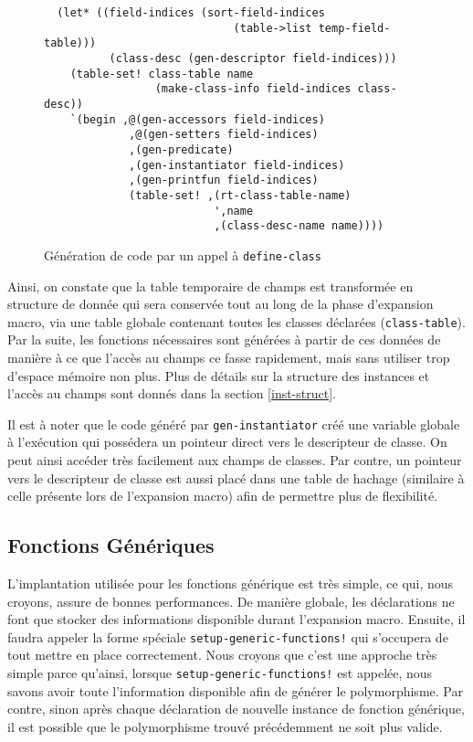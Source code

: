       \begin{figure}[h!]
        \begin{lstlisting}
  (let* ((field-indices (sort-field-indices
                             (table->list temp-field-table)))
          (class-desc (gen-descriptor field-indices)))
    (table-set! class-table name 
                 (make-class-info field-indices class-desc))
    `(begin ,@(gen-accessors field-indices)
             ,@(gen-setters field-indices)
             ,(gen-predicate)
             ,(gen-instantiator field-indices)
             ,(gen-printfun field-indices)
             (table-set! ,(rt-class-table-name)
                          ',name
                          ,(class-desc-name name))))
        \end{lstlisting}
        \caption{Génération de code par un appel à \texttt{define-class}}
        \label{class-code-gen}
      \end{figure}

      Ainsi, on constate que la table temporaire de champs est
      transformée en structure de donnée qui sera conservée tout au
      long de la phase d'expansion macro, via une table globale
      contenant toutes les classes déclarées
      (\texttt{class-table}). Par la suite, les fonctions nécessaires
      sont générées à partir de ces données de manière à ce que
      l'accès au champs ce fasse rapidement, mais sans utiliser trop
      d'espace mémoire non plus. Plus de détails sur la structure des
      instances et l'accès au champs sont donnés dans la section
      \ref{inst-struct}.

      Il est à noter que le code généré par \texttt{gen-instantiator}
      créé une variable globale à l'exécution qui possédera un
      pointeur direct vers le descripteur de classe. On peut ainsi
      accéder très facilement aux champs de classes. Par contre, un
      pointeur vers le descripteur de classe est aussi placé dans une
      table de hachage (similaire à celle présente lors de l'expansion
      macro) afin de permettre plus de flexibilité.

  \subsection{Fonctions Génériques}
    L'implantation utilisée pour les fonctions générique est très
    simple, ce qui, nous croyons, assure de bonnes performances. De
    manière globale, les déclarations ne font que stocker des
    informations disponible durant l'expansion macro. Ensuite, il
    faudra appeler la forme spéciale
    \texttt{setup-generic-functions!} qui s'occupera de tout mettre en
    place correctement. Nous croyons que c'est une approche très
    simple parce qu'ainsi, lorsque \texttt{setup-generic-functions!}
    est appelée, nous savons avoir toute l'information disponible
    afin de générer le polymorphisme. Par contre, sinon après chaque
    déclaration de nouvelle instance de fonction générique, il est
    possible que le polymorphisme trouvé précédemment ne soit plus
    valide.

